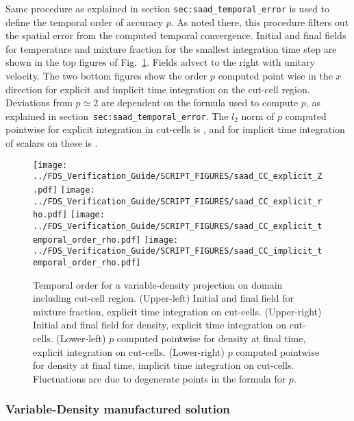 \documentclass[12pt]{article}
\begin{document}
Same procedure as explained in section  \texttt{sec:saad\_temporal\_error} is used to define the temporal order of accuracy $p$. As noted there, this procedure filters out the spatial error from the computed temporal convergence. Initial and final fields for temperature and mixture fraction for the smallest integration time step are shown in the top figures of Fig.~\ref{fig:saad_cc_temporal_order}. Fields advect to the right with unitary velocity. The two bottom figures show the order $p$ computed point wise in the $x$ direction for explicit and implicit time integration on the cut-cell region. Deviations from $p \simeq 2$ are dependent on the formula used to compute $p$, as explained in section~\texttt{sec:saad\_temporal\_error}.
The $l_2$ norm of $p$ computed pointwise for explicit integration in cut-cells is \!, and for implicit time integration of scalars on these is  \!.

\begin{figure}[ht]
\centering
\texttt{[image: ../FDS\_Verification\_Guide/SCRIPT\_FIGURES/saad\_CC\_explicit\_Z.pdf]}
\texttt{[image: ../FDS\_Verification\_Guide/SCRIPT\_FIGURES/saad\_CC\_explicit\_rho.pdf]}
\texttt{[image: ../FDS\_Verification\_Guide/SCRIPT\_FIGURES/saad\_CC\_explicit\_temporal\_order\_rho.pdf]}
\texttt{[image: ../FDS\_Verification\_Guide/SCRIPT\_FIGURES/saad\_CC\_implicit\_temporal\_order\_rho.pdf]}
\caption[The {\ct saad CC} temporal order test case]{Temporal order for a variable-density projection on domain including cut-cell region.  (Upper-left) Initial and final field for mixture fraction, explicit time integration on cut-cells.  (Upper-right) Initial and final field for density, explicit time integration on cut-cells.  (Lower-left) $p$ computed pointwise for density at final time, explicit integration on cut-cells. (Lower-right) $p$ computed pointwise for density at final time, implicit time integration on cut-cells.  Fluctuations are due to degenerate points in the formula for $p$.}\label{fig:saad_cc_temporal_order}
\end{figure}


\subsubsection{Variable-Density manufactured solution}

\label{sec:shunn_cc_mms}
\end{document}
